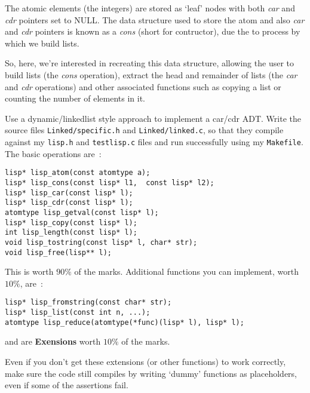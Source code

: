 \noindent The atomic elements (the integers) are stored as `leaf' nodes with both {\it car} and {\it cdr}
pointers set to NULL. The data structure used to store the atom and also {\it car} and {\it cdr} pointers
is known as a {\it cons} (short for contructor), due the to process by which we build lists.

So, here, we're interested in recreating this data structure, allowing the user to build lists (the
{\it cons} operation), extract the head and remainder of lists (the {\it car} and {\it cdr} operations)
and other associated functions such as copying a list or counting the number of elements in it.

\begin{exercise}
Use a dynamic/linkedlist style approach to implement a car/cdr ADT. Write the source files
\verb^Linked/specific.h^ and \verb^Linked/linked.c^, so that they compile against my
\verb^lisp.h^ and \verb^testlisp.c^ files and run successfully using my \verb^Makefile^.
The basic operations are~:
\begin{verbatim}
lisp* lisp_atom(const atomtype a);
lisp* lisp_cons(const lisp* l1,  const lisp* l2);
lisp* lisp_car(const lisp* l);
lisp* lisp_cdr(const lisp* l);
atomtype lisp_getval(const lisp* l);
lisp* lisp_copy(const lisp* l);
int lisp_length(const lisp* l);
void lisp_tostring(const lisp* l, char* str);
void lisp_free(lisp** l);
\end{verbatim}

\noindent This is worth $90\%$ of the marks.
Additional functions you can implement, worth $10\%$, are~:
\begin{verbatim}
lisp* lisp_fromstring(const char* str);
lisp* lisp_list(const int n, ...);
atomtype lisp_reduce(atomtype(*func)(lisp* l), lisp* l);
\end{verbatim}
and are {\bf Exensions} worth $10\%$ of the marks.

\noindent Even if you don't get these extensions (or other functions) to work correctly, make
sure the code still compiles by writing `dummy' functions as placeholders,
even if some of the assertions fail.
\end{exercise}
